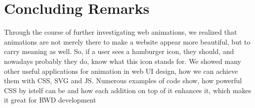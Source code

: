 %
%
% 
% 
% 


\chapter{Concluding Remarks}

\label{chap:Concl}

Through the course of further investigating web animations, we realized that 
animations are not merely there to make a website appear more beautiful, but to 
carry meaning as well. So, if a user sees a hamburger icon, they should, and 
nowadays probably they do, know what this icon stands for. We showed many other 
useful applications for animation in web UI design, how we can achieve them 
with CSS, SVG and JS. Numerous examples of code show, how powerful CSS by 
istelf can be and how each addition on top of it enhances it, which makes it 
great for RWD development 
